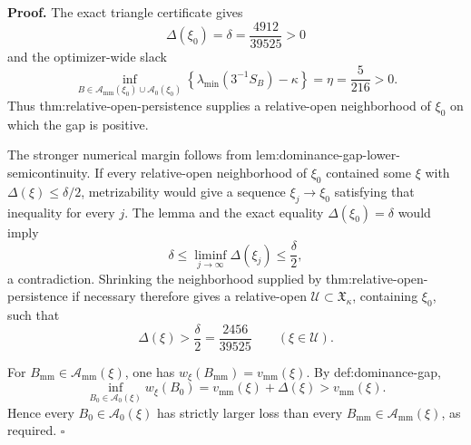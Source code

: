 \textbf{Proof.}
The exact triangle certificate gives
\[
\Delta(\xi_0)=\delta=\frac{4912}{39525}>0
\]
and the optimizer-wide slack
\[
\inf_{B\in\mathcal A_{\mathrm{mm}}(\xi_0)\cup\mathcal A_0(\xi_0)}
\left\{\lambda_{\min}(3^{-1}S_B)-\kappa\right\}
=\eta=\frac5{216}>0.
\]
Thus thm:relative-open-persistence supplies a relative-open neighborhood of \(\xi_0\) on which the gap is positive.

The stronger numerical margin follows from lem:dominance-gap-lower-semicontinuity.  If every relative-open neighborhood of \(\xi_0\) contained some \(\xi\) with \(\Delta(\xi)\le\delta/2\), metrizability would give a sequence \(\xi_j\to\xi_0\) satisfying that inequality for every \(j\).  The lemma and the exact equality \(\Delta(\xi_0)=\delta\) would imply
\[
\delta
\le\liminf_{j\to\infty}\Delta(\xi_j)
\le\frac{\delta}{2},
\]
a contradiction.  Shrinking the neighborhood supplied by thm:relative-open-persistence if necessary therefore gives a relative-open \(\mathcal U\subset\mathfrak X_\kappa\), containing \(\xi_0\), such that
\[
\Delta(\xi)>\frac\delta2=\frac{2456}{39525}
\qquad(\xi\in\mathcal U).
\]

For \(B_{\mathrm{mm}}\in\mathcal A_{\mathrm{mm}}(\xi)\), one has \(w_\xi(B_{\mathrm{mm}})=v_{\mathrm{mm}}(\xi)\).  By def:dominance-gap,
\[
\inf_{B_0\in\mathcal A_0(\xi)}w_\xi(B_0)
=v_{\mathrm{mm}}(\xi)+\Delta(\xi)
>v_{\mathrm{mm}}(\xi).
\]
Hence every \(B_0\in\mathcal A_0(\xi)\) has strictly larger loss than every \(B_{\mathrm{mm}}\in\mathcal A_{\mathrm{mm}}(\xi)\), as required. \(\square\)
